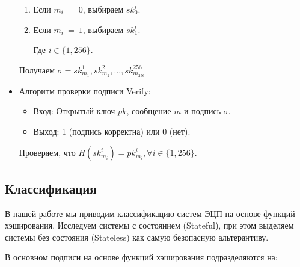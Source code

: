 \documentclass[a4paper, 14pt]{extarticle}
\begin{document}
\begin{itemize}
    \begin{enumerate}
        \item Если $m_{i}\ =\ 0$, выбираем $sk^{i}_{0}$.
        \item Если $m_{i}\ =\ 1$, выбираем $sk^{i}_{1}$.
        
        Где $i \in \{1, 256\}$.
    \end{enumerate}

    Получаем $\sigma = sk^{1}_{m_{1}}, sk^{2}_{m_{2}}, ..., sk^{256}_{m_{256}}$

    \item Алгоритм проверки подписи Verify:

    \begin{itemize}
        \item Вход: Открытый ключ $pk$, сообщение $m$ и подпись $\sigma$.
        \item Выход: 1 (подпись корректна) или 0 (нет).
    \end{itemize}

    Проверяем, что $H(sk^{i}_{m_{i}}) = pk^{i}_{m_{i}}, \forall i \in \{1, 256\}$.
\end{itemize}

\newpage

\subsection{Классификация}
В нашей работе мы приводим классификацию систем ЭЦП на основе функций хэширования. Исследуем системы с состоянием (Stateful), при этом выделяем системы без состояния (Stateless) как самую безопасную альтерантиву.\newline

В основном подписи на основе функций хэширования подразделяются на:
\end{document}
